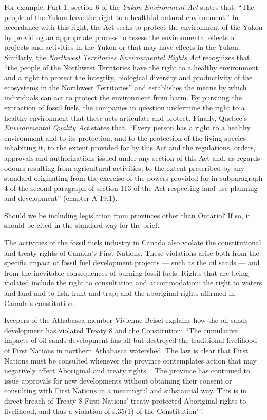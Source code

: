 For example, Part 1, section 6 of the \emph{Yukon Environment Act} states that: ``The people of the Yukon have the right to a healthful natural environment.''   
In accordance with this right, the Act seeks to protect the environment of the Yukon by providing an appropriate process to assess the environmental effects of projects and activities in the Yukon or that may have effects in the Yukon. Similarly, the \emph{Northwest Territories Environmental Rights Act} recognizes that ``the people of the Northwest Territories have the right to a healthy environment and a right to protect the integrity, biological diversity and productivity of the ecosystems in the Northwest Territories'' and establishes the means by which individuals can act to protect the environment from harm. By pursuing the extraction of fossil fuels, the companies in question undermine the right to a healthy environment that these acts articulate and protect. Finally, Quebec’s \emph{Environmental Quality Act} states that, ``Every person has a right to a healthy environment and to its protection, and to the protection of the living species inhabiting it, to the extent provided for by this Act and the regulations, orders, approvals and authorizations issued under any section of this Act and, as regards odours resulting from agricultural activities, to the extent prescribed by any standard originating from the exercise of the powers provided for in subparagraph 4 of the second paragraph of section 113 of the Act respecting land use planning and development'' (chapter A-19.1).  

\begin{vcom}
	Should we be including legislation from provinces other than Ontario? If so, it should be cited in the standard way for the brief.
\end{vcom}

The activities of the fossil fuels industry in Canada also violate the constitutional and treaty rights of Canada's First Nations.
These violations arise both from the specific impact of fossil fuel development projects --- such as the oil sands --- and from the inevitable consequences of burning fossil fuels.
Rights that are being violated include the right to consultation and accommodation; the right to waters and land and to fish, hunt and trap; and the aboriginal rights affirmed in Canada's constitution.



Keepers of the Athabasca member Vivienne Beisel explains how the oil sands development has violated Treaty 8 and the Constitution: ``The cumulative impacts of oil sands development has all but destroyed the traditional livelihood of First Nations in northern Athabasca watershed. 
The law is clear that First Nations must be consulted whenever the province contemplates action that may negatively affect Aboriginal and treaty rights...
The province has continued to issue approvals for new developments without obtaining their consent or consulting with First Nations in a meaningful and substantial way. 
This is in direct breach of Treaty 8 First Nations' treaty-protected Aboriginal rights to livelihood, and thus a violation of s.35(1) of the Constitution'''.


